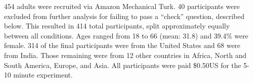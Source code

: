 \documentclass[10pt,letterpaper]{article}
\begin{document}
454 adults were recruited via Amazon Mechanical Turk. %
40 participants were excluded from further analysis for failing to pass a ``check'' question, described below.  This resulted in 414 total participants, split approximately equally between all conditions. %
Ages ranged from 18 to 66 (mean: 31.8) and 39.4\% were female. 314 of the final participants were from the United States and 68 were from India. Those remaining were from 12 other countries in Africa, North and South America, Europe, and Asia. All participants were paid \$0.50US for the 5-10 minute experiment.

\end{document}
